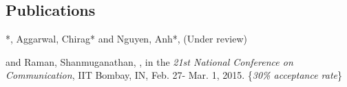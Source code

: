 \documentclass[mm]{simple_style}
\begin{document}
\begin{resume}
\vspace{1ex}
\section{Publications}

*, Aggarwal, Chirag* and Nguyen, Anh*,  (Under review)

 and Raman, Shanmuganathan, , in the \textit{21st National Conference on Communication}, IIT Bombay, IN, Feb. 27- Mar. 1, 2015. \{\textit{30\% acceptance rate}\}
\\[1ex]
\sectionline

\iffalse
\section{Awards \& Achievements}


- Awarded Teaching Assistantship by Auburn University (Aug 18 - Present)\\
- Recipient of Merit-cum-Means scholarship award for meritorious performance throughout the undergraduate program\\  
- Featured thrice in Dean's List Award for Academic Excellence (IITGN)\\
- Recipient of the National Instruments Student Travel Fellowship for NCC 2015 conference\\  
- Recipient of scholarship under Central Sector Scholarship Scheme (CSSS) for outstanding\\ performance in XII Exams
\\[1ex]%
\sectionline
\fi


\end{resume}
\end{document}

